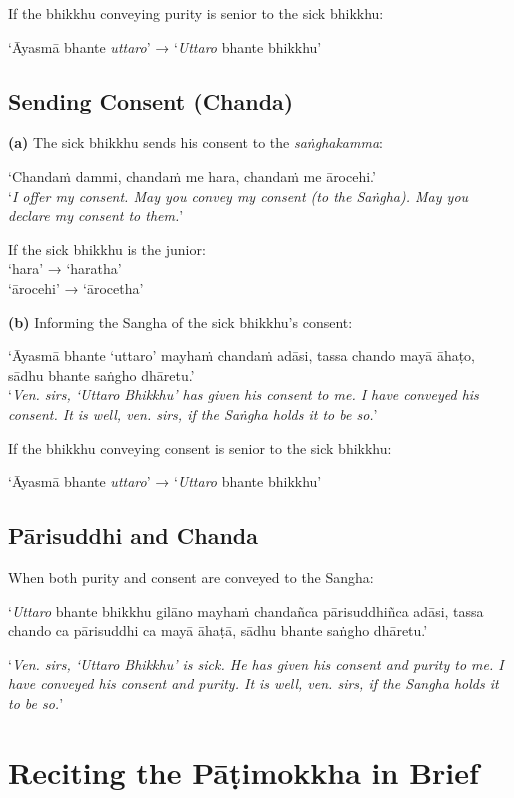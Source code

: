 If the bhikkhu conveying purity is senior to the sick bhikkhu:

‘Āyasmā bhante \emph{uttaro}’ → ‘\emph{Uttaro} bhante bhikkhu’

\subsection{Sending Consent (Chanda)}

\textbf{(a)} The sick bhikkhu sends his consent to the \emph{saṅghakamma}:

‘Chandaṁ dammi, chandaṁ me hara, chandaṁ me ārocehi.’\\
‘\emph{I offer my consent. May you convey my consent (to the Saṅgha). May you
  declare my consent to them.}’

If the sick bhikkhu is the junior:\\
‘hara’ → ‘haratha’\\
‘ārocehi’ → ‘ārocetha’

\ifhandbookedition
\clearpage
\fi

\textbf{(b)} Informing the Sangha of the sick bhikkhu's consent:

‘Āyasmā bhante ‘uttaro’ mayhaṁ chandaṁ adāsi, tassa chando mayā āhaṭo, sādhu bhante saṅgho dhāretu.’\\
‘\emph{Ven. sirs, ‘Uttaro Bhikkhu’ has given his consent to me. I have conveyed
  his consent. It is well, ven. sirs, if the Saṅgha holds it to be so.}’

If the bhikkhu conveying consent is senior to the sick bhikkhu:

‘Āyasmā bhante \emph{uttaro}’ → ‘\emph{Uttaro} bhante bhikkhu’

\subsection{Pārisuddhi and Chanda}

When both purity and consent are conveyed to the Sangha:

‘\emph{Uttaro} bhante bhikkhu gilāno mayhaṁ chandañca pārisuddhiñca adāsi, tassa
chando ca pārisuddhi ca mayā āhaṭā, sādhu bhante saṅgho dhāretu.’

‘\emph{Ven. sirs, ‘Uttaro Bhikkhu’ is sick. He has given his consent and purity
  to me. I have conveyed his consent and purity. It is well, ven. sirs, if the
  Sangha holds it to be so.}’

\ifhandbookedition
\clearpage
\fi

\section{Reciting the Pāṭimokkha in Brief}

